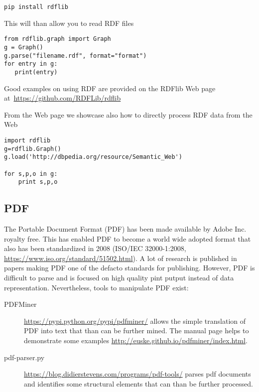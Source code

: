 \begin{verbatim}
pip install rdflib
\end{verbatim}

This will than allow you to read RDF files

\begin{verbatim}
from rdflib.graph import Graph
g = Graph()
g.parse("filename.rdf", format="format")
for entry in g:
   print(entry)
\end{verbatim}

Good examples on using RDF are provided on the RDFlib Web page
at~\url{https://github.com/RDFLib/rdflib}

From the Web page we showcase also how to directly process RDF data
from the Web

\begin{verbatim}
import rdflib
g=rdflib.Graph()
g.load('http://dbpedia.org/resource/Semantic_Web')

for s,p,o in g:
    print s,p,o
\end{verbatim}

\subsection{PDF}

The Portable Document Format (PDF) has been made available by Adobe
Inc. royalty free. This has enabled PDF to become a world wide adopted
format that also has been standardized in 2008 (ISO/IEC 32000-1:2008,
\url{https://www.iso.org/standard/51502.html}).  A lot of research is
published in papers making PDF one of the defacto standards for
publishing. However, PDF is difficult to parse and is focused on high
quality pint putput instead of data representation. Nevertheless,
tools to manipulate PDF exist:

\begin{description}
\item[PDFMiner] \url{https://pypi.python.org/pypi/pdfminer/} allows
  the simple translation of PDF into text that than can be further
  mined. The manual page helps to demonstrate some examples
  \url{http://euske.github.io/pdfminer/index.html}.

\item[pdf-parser.py]
  \url{https://blog.didierstevens.com/programs/pdf-tools/} parses pdf
  documents and identifies some structural elements that can than be
  further processed.

\end{description}

